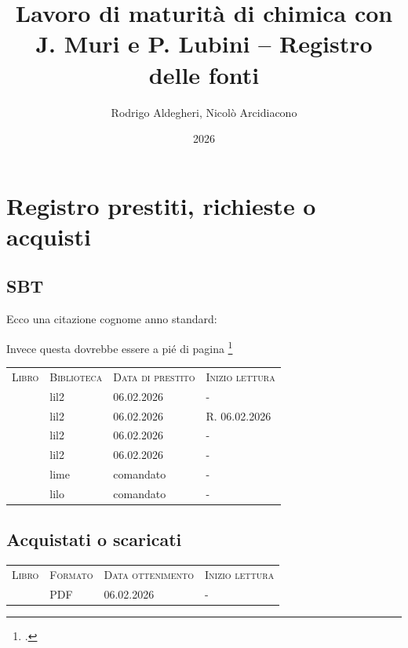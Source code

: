 \documentclass[oneside]{book} %
\title{Lavoro di maturità di chimica con J. Muri e P. Lubini – Registro delle fonti}
\author{Rodrigo Aldegheri, Nicolò Arcidiacono}
\date{2026}
\begin{document}
\maketitle
\tableofcontents

\chapter{Registro prestiti, richieste o acquisti}
    \section{SBT}

        Ecco una citazione cognome anno standard: \parencite{Zanichelli}

        Invece questa dovrebbe essere a pié di pagina \footcite{Zanichelli}

        \begin{tabular}{llll}
            \textsc{Libro} & \textsc{Biblioteca} & \textsc{Data di prestito} & \textsc{Inizio lettura}\\
            \parencite{Zanichelli} & lil2 & 06.02.2026 & -\\
            \parencite{Hoepli} & lil2 & 06.02.2026 & R. 06.02.2026\\
            \parencite{birraCasa} & lil2 & 06.02.2026 & -\\
            \parencite{piacereBirra} & lil2 & 06.02.2026 & -\\
            \parencite{ingredientiBirra} & lime & comandato & -\\
            \parencite{mondoFermentazioneKatz} & lilo & comandato & -\\
        \end{tabular}

    \section{Acquistati o scaricati}

        \begin{tabular}{llll}
            \textsc{Libro} & \textsc{Formato} & \textsc{Data ottenimento} & \textsc{Inizio lettura}\\
            \parencite{artFermentationKatz} & PDF & 06.02.2026 & -
        \end{tabular}



\printbibliography
\end{document}
